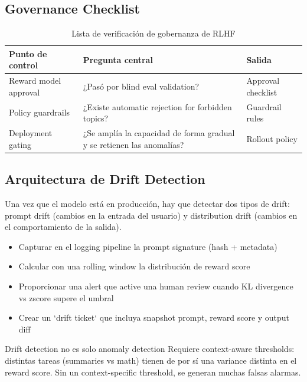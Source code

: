 \documentclass[a4paper]{article}
\begin{document}
\subsection{Governance Checklist}

\begin{table}[H]
\centering
\begin{tabular}{p{} p{} p{}}
\toprule
Punto de control & Pregunta central & Salida \\
\midrule
Reward model approval & ¿Pasó por blind eval validation? & Approval checklist \\
Policy guardrails & ¿Existe automatic rejection for forbidden topics? & Guardrail rules \\
Deployment gating & ¿Se amplía la capacidad de forma gradual y se retienen las anomalías? & Rollout policy \\
\bottomrule
\end{tabular}
\caption{Lista de verificación de gobernanza de RLHF}
\end{table}

\subsection{Arquitectura de Drift Detection}

Una vez que el modelo está en producción, hay que detectar dos tipos de drift: prompt drift (cambios en la entrada del usuario) y distribution drift (cambios en el comportamiento de la salida).

\begin{itemize}
    \item Capturar en el logging pipeline la prompt signature (hash + metadata)
    \item Calcular con una rolling window la distribución de reward score
    \item Proporcionar una alert que active una human review cuando KL divergence vs zscore supere el umbral
    \item Crear un `drift ticket` que incluya snapshot prompt, reward score y output diff
\end{itemize}

\begin{knowledgebox}{Drift detection no es solo anomaly detection}
Requiere context-aware thresholds: distintas tareas (summaries vs math) tienen de por sí una variance distinta en el reward score. Sin un context-specific threshold, se generan muchas falsas alarmas.
\end{knowledgebox}
\end{document}
